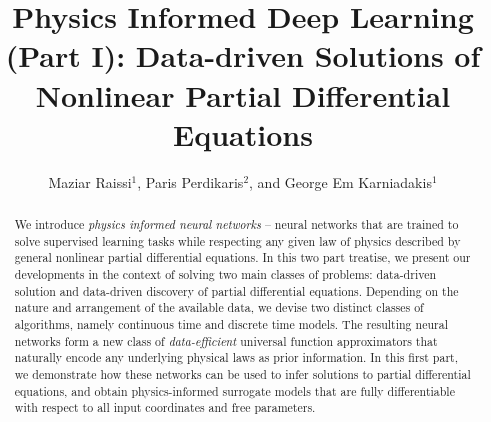 \documentclass[preprint,12pt]{elsarticle}
\begin{document}
\begin{frontmatter}


\title{Physics Informed Deep Learning (Part I): Data-driven Solutions of Nonlinear Partial Differential Equations}




\author{Maziar Raissi$^{1}$, Paris Perdikaris$^{2}$, and George Em Karniadakis$^{1}$}
\address{$^{1}$Division of Applied Mathematics, Brown University,\\ Providence, RI, 02912, USA\\
$^{2}$Department of Mechanical Engineering and Applied Mechanics,\\ University of Pennsylvania,\\ Philadelphia, PA, 19104, USA}

\begin{abstract}

We introduce {\em physics informed neural networks} -- neural networks that are trained to solve supervised learning tasks while respecting any given law of physics described by general nonlinear partial differential equations. In this two part treatise, we present our developments in the context of solving two main classes of problems: data-driven solution and data-driven discovery of partial differential equations. Depending on the nature and arrangement of the available data, we devise two distinct classes of algorithms, namely continuous time and discrete time models. The resulting neural networks form a new class of {\em data-efficient} universal function approximators that naturally encode any underlying physical laws as prior information. In this first part, we demonstrate how these networks can be used to infer solutions to partial differential equations, and obtain physics-informed surrogate models that are fully differentiable with respect to all input coordinates and free parameters. 


\end{abstract}
\end{frontmatter}
\end{document}
